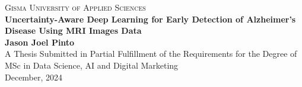 \documentclass[12pt,onecolumn]{report}
\begin{document}

\begin{titlepage}
    \begin{center}
        
        \textsc{\Large Gisma University of Applied Sciences} \\[1.5cm]
        \vfill  
        {\bfseries\Huge Uncertainty-Aware Deep Learning for Early Detection of Alzheimer’s Disease Using MRI Images Data \\[0.4cm]}
        \vfill        
        {\Large \textbf{Jason Joel Pinto}} \\[2cm]
        \vfill
        {\large A Thesis Submitted in Partial Fulfillment of the Requirements for the Degree of} \\[0.5cm]
        {\Large MSc in Data Science, AI and Digital Marketing} \\[1.5cm]
        
        {\large December, 2024}
        
        \vfill
    \end{center}
\end{titlepage}
\end{document}
